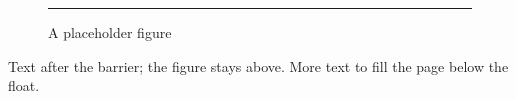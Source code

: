 \documentclass{article}
\begin{document}
\begin{figure}[ht]
\centering
\rule{3cm}{2cm}
\caption{A placeholder figure}
\end{figure}
\FloatBarrier
Text after the barrier; the figure stays above.
More text to fill the page below the float.
\end{document}
